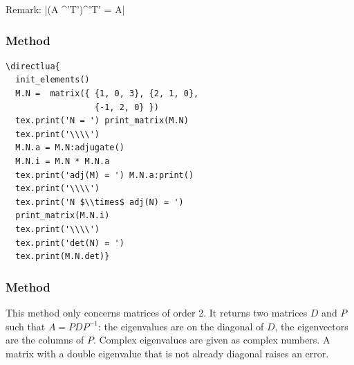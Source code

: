 \vspace{.5em}
Remark: |(A ^'T')^'T' = A|

\subsubsection{Method }
\label{ssub:method_adjugate}

\begin{minipage}{.6\textwidth}
\begin{verbatim}
\directlua{
  init_elements()
  M.N =  matrix({ {1, 0, 3}, {2, 1, 0},
                  {-1, 2, 0} })
  tex.print('N = ') print_matrix(M.N)
  tex.print('\\\\')
  M.N.a = M.N:adjugate()
  M.N.i = M.N * M.N.a
  tex.print('adj(M) = ') M.N.a:print()
  tex.print('\\\\')
  tex.print('N $\\times$ adj(N) = ')
  print_matrix(M.N.i)
  tex.print('\\\\')
  tex.print('det(N) = ')
  tex.print(M.N.det)}
\end{verbatim}
\end{minipage}
\begin{minipage}{.4\textwidth}
\end{minipage}
\newpage


\subsubsection{Method }
\label{ssub:diagonalization}

This method only concerns matrices of order 2. It returns two matrices $D$ and $P$ such that $A = PDP^{-1}$: the eigenvalues are on the diagonal of $D$, the eigenvectors are the columns of $P$. Complex eigenvalues are given as complex numbers. A matrix with a double eigenvalue that is not already diagonal raises an error.

